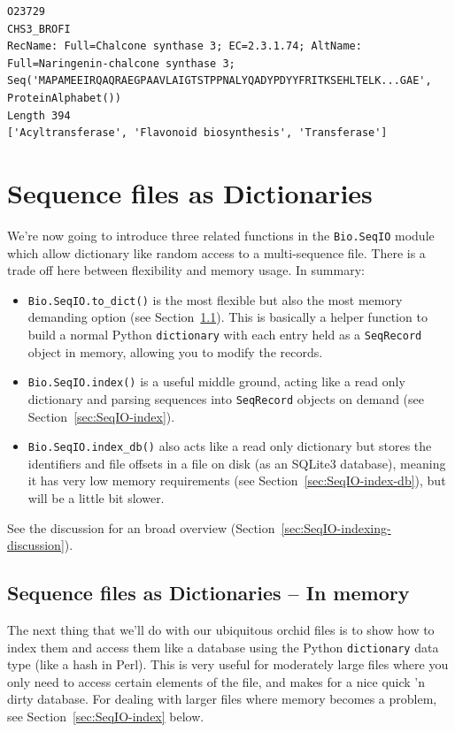 \documentclass{report}
\begin{document}
\begin{verbatim}
O23729
CHS3_BROFI
RecName: Full=Chalcone synthase 3; EC=2.3.1.74; AltName: Full=Naringenin-chalcone synthase 3;
Seq('MAPAMEEIRQAQRAEGPAAVLAIGTSTPPNALYQADYPDYYFRITKSEHLTELK...GAE', ProteinAlphabet())
Length 394
['Acyltransferase', 'Flavonoid biosynthesis', 'Transferase']
\end{verbatim}

\section{Sequence files as Dictionaries}

We're now going to introduce three related functions in the \verb|Bio.SeqIO|
module which allow dictionary like random access to a multi-sequence file.
There is a trade off here between flexibility and memory usage. In summary:
\begin{itemize}
\item \verb|Bio.SeqIO.to_dict()| is the most flexible but also the most
memory demanding option (see Section~\ref{SeqIO:to_dict}). This is basically
a helper function to build a normal Python \verb|dictionary| with each entry
held as a \verb|SeqRecord| object in memory, allowing you to modify the
records.
\item \verb|Bio.SeqIO.index()| is a useful middle ground, acting like a
read only dictionary and parsing sequences into \verb|SeqRecord| objects
on demand (see Section~\ref{sec:SeqIO-index}).
\item \verb|Bio.SeqIO.index_db()| also acts like a read only dictionary
but stores the identifiers and file offsets in a file on disk (as an
SQLite3 database), meaning it has very low memory requirements (see
Section~\ref{sec:SeqIO-index-db}), but will be a little bit slower.
\end{itemize}
See the discussion for an broad overview
(Section~\ref{sec:SeqIO-indexing-discussion}).

\subsection{Sequence files as Dictionaries -- In memory}
\label{SeqIO:to_dict}

The next thing that we'll do with our ubiquitous orchid files is to show how
to index them and access them like a database using the Python \verb|dictionary|
data type (like a hash in Perl). This is very useful for moderately large files
where you only need to access certain elements of the file, and makes for a nice
quick 'n dirty database. For dealing with larger files where memory becomes a
problem, see Section~\ref{sec:SeqIO-index} below.
\end{document}
